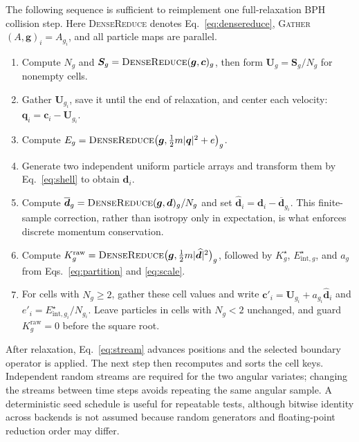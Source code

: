 \documentclass[a4paper,11pt]{article}
\newcommand{\vect}[1]{\bm{#1}}
\begin{document}
The following sequence is sufficient to reimplement one full-relaxation BPH
collision step.  Here \textsc{DenseReduce} denotes
Eq.~\eqref{eq:densereduce}, \textsc{Gather}$(A,\vect{g})_i=A_{g_i}$, and all
particle maps are parallel.
\begin{enumerate}[label=\arabic*.]
 \item Compute $N_g$ and
       $\vect{S}_g=\textsc{DenseReduce}(\vect{g},\vect{c})_g$, then form
       $\vect{U}_g=\vect{S}_g/N_g$ for nonempty cells.
 \item Gather $\vect{U}_{g_i}$, save it until the end of relaxation, and center
       each velocity: $\vect{q}_i=\vect{c}_i-\vect{U}_{g_i}$.
 \item Compute
       $E_g=\textsc{DenseReduce}\bigl(\vect{g},
       \tfrac12m|\vect{q}|^2+e\bigr)_g$.
 \item Generate two independent uniform particle arrays and transform them by
       Eq.~\eqref{eq:shell} to obtain $\vect{d}_i$.
 \item Compute
       $\overline{\vect{d}}_g=
       \textsc{DenseReduce}(\vect{g},\vect{d})_g/N_g$ and set
       $\widehat{\vect{d}}_i=\vect{d}_i-
       \overline{\vect{d}}_{g_i}$.  This finite-sample correction, rather than
       isotropy only in expectation, is what enforces discrete momentum
       conservation.
 \item Compute
       $K_g^{\mathrm{raw}}=\textsc{DenseReduce}\bigl(\vect{g},
       \tfrac12m|\widehat{\vect{d}}|^2\bigr)_g$, followed by
       $K_g^\star$, $E_{\mathrm{int},g}^\star$, and $a_g$ from
       Eqs.~\eqref{eq:partition} and \eqref{eq:scale}.
 \item For cells with $N_g\geq2$, gather these cell values and write
       $\vect{c}'_i=\vect{U}_{g_i}+a_{g_i}\widehat{\vect{d}}_i$ and
       $e'_i=E_{\mathrm{int},g_i}^\star/N_{g_i}$.  Leave particles in cells
       with $N_g<2$ unchanged, and guard $K_g^{\mathrm{raw}}=0$ before the
       square root.
\end{enumerate}

After relaxation, Eq.~\eqref{eq:stream} advances positions and the selected
boundary operator is applied.  The next step then recomputes and sorts the cell
keys.  Independent random streams are required for the two angular variates;
changing the streams between time steps avoids repeating the same angular
sample.  A deterministic seed schedule is useful for repeatable tests, although
bitwise identity across backends is not assumed because random generators and
floating-point reduction order may differ.
\end{document}
